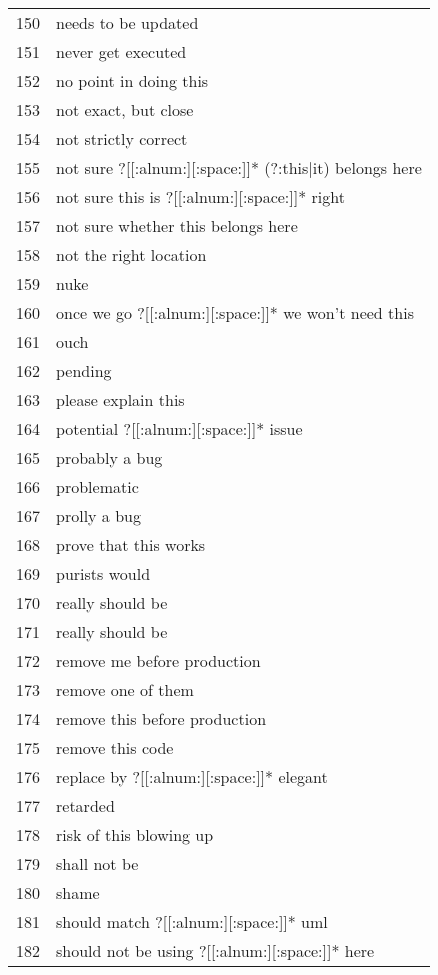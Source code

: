\begin{longtable}{r|l}
150 & needs to be updated\\
151 & never get executed\\
152 & no point in doing this\\
153 & not exact, but close\\
154 & not strictly correct\\
155 & not sure ?[[:alnum:][:space:]]* (?:this|it) belongs here\\
156 & not sure this is ?[[:alnum:][:space:]]* right\\
157 & not sure whether this belongs here\\
158 & not the right location\\
159 & nuke\\
160 & once we go ?[[:alnum:][:space:]]* we won't need this\\
161 & ouch\\
162 & pending\\
163 & please explain this\\
164 & potential ?[[:alnum:][:space:]]* issue\\
165 & probably a bug\\
166 & problematic\\
167 & prolly a bug\\
168 & prove that this works\\
169 & purists would\\
170 & really should be\\
171 & really should be\\
172 & remove me before production\\
173 & remove one of them\\
174 & remove this before production\\
175 & remove this code\\
176 & replace by ?[[:alnum:][:space:]]* elegant\\
177 & retarded\\
178 & risk of this blowing up\\
179 & shall not be\\
180 & shame\\
181 & should match ?[[:alnum:][:space:]]* uml\\
182 & should not be using ?[[:alnum:][:space:]]* here\\

\end{longtable}
